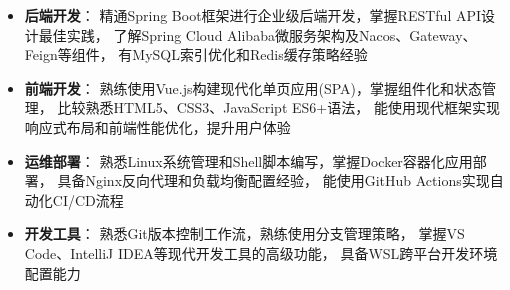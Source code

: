 \documentclass[zh]{resume}
\begin{document}
\begin{itemize}
  \item \textbf{后端开发}：
    精通Spring Boot框架进行企业级后端开发，掌握RESTful API设计最佳实践，
    了解Spring Cloud Alibaba微服务架构及Nacos、Gateway、Feign等组件，
    有MySQL索引优化和Redis缓存策略经验
  
  \item \textbf{前端开发}：
    熟练使用Vue.js构建现代化单页应用(SPA)，掌握组件化和状态管理，
    比较熟悉HTML5、CSS3、JavaScript ES6+语法，
    能使用现代框架实现响应式布局和前端性能优化，提升用户体验
  
  \item \textbf{运维部署}：
    熟悉Linux系统管理和Shell脚本编写，掌握Docker容器化应用部署，
    具备Nginx反向代理和负载均衡配置经验，
    能使用GitHub Actions实现自动化CI/CD流程
  
  \item \textbf{开发工具}：
    熟悉Git版本控制工作流，熟练使用分支管理策略，
    掌握VS Code、IntelliJ IDEA等现代开发工具的高级功能，
    具备WSL跨平台开发环境配置能力

\end{itemize}
\end{document}
